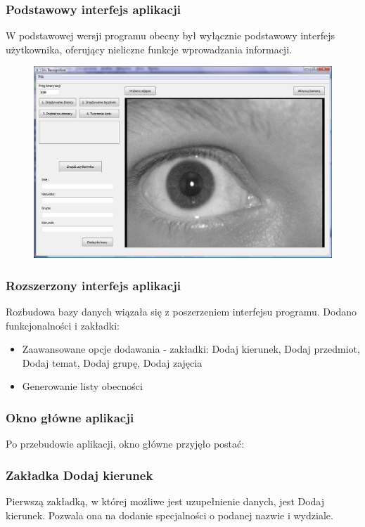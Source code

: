 \documentclass{beamer}
\begin{document}
\begin{frame}
\frametitle{Podstawowy interfejs aplikacji}
W podstawowej wersji programu obecny był wyłącznie podstawowy interfejs użytkownika, oferujący nieliczne funkcje wprowadzania informacji.
\begin{figure}
\includegraphics[scale=0.2]{oknoGlowne.jpg}
\end{figure}
\end{frame}

\begin{frame}
\frametitle{Rozszerzony interfejs aplikacji}
Rozbudowa bazy danych wiązała się z poszerzeniem interfejsu programu. Dodano funkcjonalności i zakładki:


\begin{itemize}
\item Zaawansowane opcje dodawania - zakładki: Dodaj kierunek, Dodaj przedmiot, Dodaj temat, Dodaj grupę, Dodaj zajęcia
\item Generowanie listy obecności
\end{itemize}
\end{frame}

\begin{frame}
\frametitle{Okno główne aplikacji}
Po przebudowie aplikacji, okno główne przyjęło postać:

\end{frame}

\begin{frame}
\frametitle{Zakładka Dodaj kierunek}
Pierwszą zakładką, w której możliwe jest uzupełnienie danych, jest Dodaj kierunek. Pozwala ona na dodanie specjalności o podanej nazwie i wydziale.

\end{frame}
\end{document}
